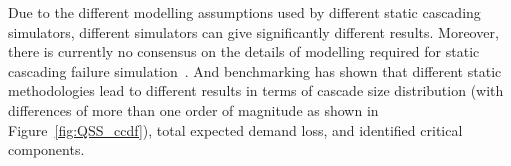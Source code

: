 %

Due to the different modelling assumptions used by different static cascading simulators, different simulators can give significantly different results. Moreover, there is currently no consensus on the details of modelling required for static cascading failure simulation~\cite{Benchmarking2018, BenefitsAndChallengesDynamicPreece}. And benchmarking has shown that different static methodologies lead to different results in terms of cascade size distribution (with differences of more than one order of magnitude as shown in Figure~\ref{fig:QSS_ccdf}), total expected demand loss, and identified critical components.

